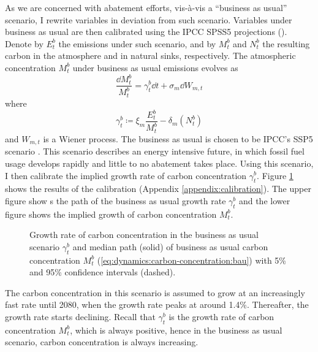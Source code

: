 \documentclass[../../main.tex]{subfiles}
\begin{document}
As we are concerned with abatement efforts, vis-à-vis a ``business as usual'' scenario, I rewrite variables in deviation from such scenario. Variables under business as usual are then calibrated using the IPCC SPSS5 projections (\citeyear{intergovernmental_panel_on_climate_change_climate_2023}). Denote by $E^b_t$ the emissions under such scenario, and by $M^b_t$ and $N^b_t$ the resulting carbon in the atmosphere and in natural sinks, respectively. The atmospheric concentration $M^b_t$ under business as usual emissions evolves as \begin{equation} \label{eq:dynamics:carbon-concentration:bau}
    \frac{\dd{M^b_t}}{M^b_t} = \gamma^b_t \dd{t} + \sigma_m \dd{W}_{m, t}
\end{equation} where \begin{equation}
    \gamma^b_t \coloneqq \xi_m \frac{E^b_t}{M^b_t} - \delta_m(N^b_t)
\end{equation} and $W_{m, t}$ is a Wiener process. The business as usual is chosen to be IPCC's SSP5 scenario \citep{kriegler_fossil-fueled_2017}. This scenario describes an energy intensive future, in which fossil fuel usage develops rapidly and little to no abatement takes place. Using this scenario, I then calibrate the implied growth rate of carbon concentration $\gamma_t^{b}$. Figure \ref{fig:bau-growth} shows the results of the calibration (Appendix \ref{appendix:calibration}). The upper figure show s the path of the business as usual growth rate $\gamma^b_t$ and the lower figure shows the implied growth of carbon concentration $M_t^b$. \begin{figure}[H]
    \centering
    
    \caption{Growth rate of carbon concentration in the business as usual scenario $\gamma^b_t$ and median path (solid) of business as usual carbon concentration $M^b_t$ (\ref{eq:dynamics:carbon-concentration:bau}) with 5\% and 95\% confidence intervals (dashed).}
    \label{fig:bau-growth}
\end{figure} \noindent The carbon concentration in this scenario is assumed to grow at an increasingly fast rate until 2080, when the growth rate peaks at around 1.4\%. Thereafter, the growth rate starts declining. Recall that $\gamma^b_t$ is the growth rate of carbon concentration $M^b_t$, which is always positive, hence in the business as usual scenario, carbon concentration is always increasing.
\end{document}
